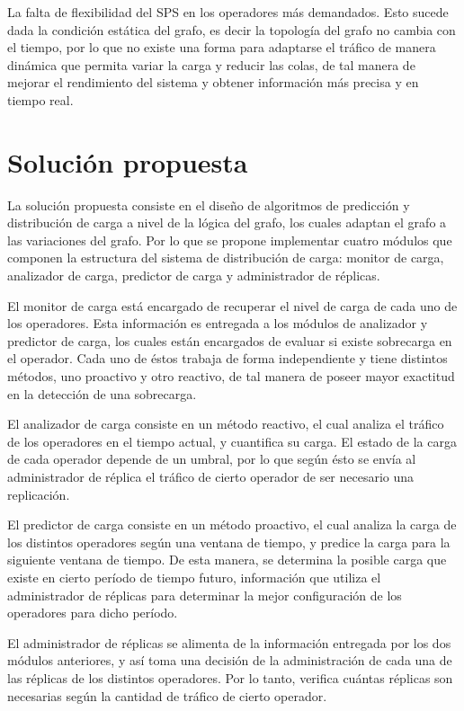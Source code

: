 La falta de flexibilidad del SPS en los operadores más demandados. Esto sucede dada la condición estática del grafo, es decir la topología del grafo no cambia con el tiempo, por lo que no existe una forma para adaptarse el tráfico de manera dinámica que permita variar la carga y reducir las colas, de tal manera de mejorar el rendimiento del sistema y obtener información más precisa y en tiempo real.

\section{Solución propuesta}
\label{intro:solucion}

La solución propuesta consiste en el dise\~no de algoritmos de predicci\'on y distribuci\'on de carga a nivel de la l\'ogica del grafo, los cuales adaptan el grafo a las variaciones del grafo. Por lo que se propone implementar cuatro módulos que componen la estructura del sistema de distribución de carga: monitor de carga, analizador de carga, predictor de carga y administrador de réplicas.

El monitor de carga está encargado de recuperar el nivel de carga de cada uno de los operadores. Esta información es entregada a los módulos de analizador y predictor de carga, los cuales están encargados de evaluar si existe sobrecarga en el operador. Cada uno de éstos trabaja de forma independiente y tiene distintos métodos, uno proactivo y otro reactivo, de tal manera de poseer mayor exactitud en la detección de una sobrecarga.

El analizador de carga consiste en un método reactivo, el cual analiza el tráfico de los operadores en el tiempo actual, y cuantifica su carga. El estado de la carga de cada operador depende de un umbral, por lo que según ésto se envía al administrador de réplica el tráfico de cierto operador de ser necesario una replicación.

El predictor de carga consiste en un método proactivo, el cual analiza la carga de los distintos operadores según una ventana de tiempo, y predice la carga para la siguiente ventana de tiempo. De esta manera, se determina la posible carga que existe en cierto período de tiempo futuro, información que utiliza el administrador de réplicas para determinar la mejor configuración de los operadores para dicho período.

El administrador de réplicas se alimenta de la información entregada por los dos módulos anteriores, y así toma una decisión de la administración de cada una de las réplicas de los distintos operadores. Por lo tanto, verifica cuántas réplicas son necesarias según la cantidad de tráfico de cierto operador.

